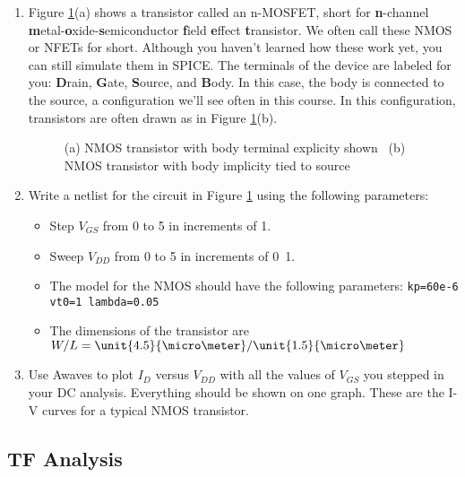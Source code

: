 \documentclass{article}
\begin{document}
\begin{enumerate}
\item Figure \ref{nmos}(a) shows a transistor called an n-MOSFET, short for \textbf{n}-channel \textbf{m}etal-\textbf{o}xide-\textbf{s}emiconductor \textbf{f}ield \textbf{e}ffect \textbf{t}ransistor. We often call these NMOS or NFETs for short. Although you haven't learned how these work yet, you can still simulate them in SPICE. The terminals of the device are labeled for you: \textbf{D}rain, \textbf{G}ate, \textbf{S}ource, and \textbf{B}ody. In this case, the body is connected to the source, a configuration we'll see often in this course. In this configuration, transistors are often drawn as in Figure \ref{nmos}(b).

	\begin{figure}[!htb]
		
		\centerline{\box\graph}
		\caption{(a) NMOS transistor with body terminal explicity shown ~(b) NMOS transistor with body implicity tied to source}
		\label{nmos}
	\end{figure}
	
\item Write a netlist for the circuit in Figure \ref{nmos} using the following parameters:

	\begin{itemize}
	\item Step $V_{GS}$ from \unit{0}{\volt} to \unit{5}{\volt} in increments of \unit{1}{\volt}.
	\item Sweep $V_{DD}$ from \unit{0}{\volt} to \unit{5}{\volt} in increments of \unit{0.1}{\volt}.
	\item The model for the NMOS should have the following parameters: \texttt{kp=60e-6 vt0=1 lambda=0.05}
	\item The dimensions of the transistor are $W/L = \unit{4.5}{\micro\meter}/\unit{1.5}{\micro\meter}$
	\end{itemize}
	
\item Use Awaves to plot $I_D$ versus $V_{DD}$ with all the values of $V_{GS}$ you stepped in your DC analysis.  Everything should be shown on one graph. These are the I-V curves for a typical NMOS transistor.

\end{enumerate}

\subsection{TF Analysis}
\end{document}

